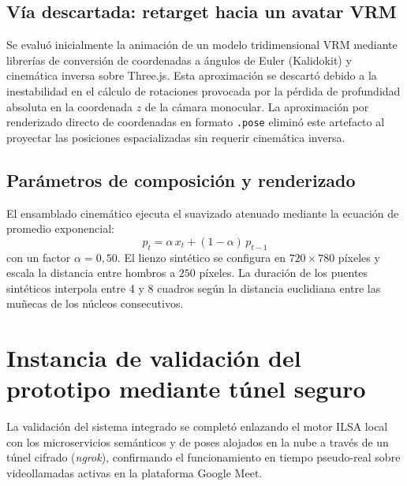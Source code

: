 \subsection{Vía descartada: retarget hacia un avatar VRM}
Se evaluó inicialmente la animación de un modelo tridimensional VRM mediante librerías de conversión de coordenadas a ángulos de Euler (Kalidokit) y cinemática inversa sobre Three.js. Esta aproximación se descartó debido a la inestabilidad en el cálculo de rotaciones provocada por la pérdida de profundidad absoluta en la coordenada $z$ de la cámara monocular. La aproximación por renderizado directo de coordenadas en formato \texttt{.pose} eliminó este artefacto al proyectar las posiciones espacializadas sin requerir cinemática inversa.

\subsection{Parámetros de composición y renderizado}
El ensamblado cinemático ejecuta el suavizado atenuado mediante la ecuación de promedio exponencial:
\begin{equation}
p_t = \alpha\, x_t + (1 - \alpha)\, p_{t-1}
\label{eq:ema_impl}
\end{equation}
con un factor $\alpha = 0{,}50$. El lienzo sintético se configura en $720 \times 780$ píxeles y escala la distancia entre hombros a $250$ píxeles. La duración de los puentes sintéticos interpola entre 4 y 8 cuadros según la distancia euclidiana entre las muñecas de los núcleos consecutivos.

\section{Instancia de validación del prototipo mediante túnel seguro}
La validación del sistema integrado se completó enlazando el motor ILSA local con los microservicios semánticos y de poses alojados en la nube a través de un túnel cifrado (\textit{ngrok}), confirmando el funcionamiento en tiempo pseudo-real sobre videollamadas activas en la plataforma Google Meet.